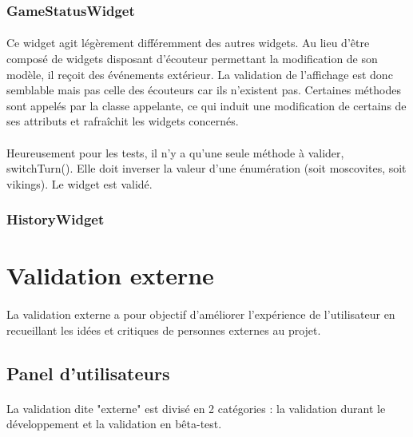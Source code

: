 \documentclass[11pt]{article} %
\begin{document}
\subsubsection{GameStatusWidget}
\paragraph{}
Ce widget agit légèrement différemment des autres widgets. Au lieu d'être composé de widgets disposant d’écouteur permettant la modification de son modèle, il reçoit des événements extérieur. La validation de l'affichage est donc semblable mais pas celle des écouteurs car ils n'existent pas. Certaines méthodes sont appelés par la classe appelante, ce qui induit une modification de certains de ses attributs et rafraîchit les widgets concernés.
\paragraph{}
Heureusement pour les tests, il n'y a qu'une seule méthode à valider, switchTurn(). Elle doit inverser la valeur d'une énumération (soit moscovites, soit vikings). Le widget est validé.

\subsubsection{HistoryWidget}

\paragraph{}

\section{Validation externe}
\paragraph{}
La validation externe a pour objectif d'améliorer l’expérience de l'utilisateur en recueillant les idées et critiques de personnes externes au projet.

\subsection{Panel d'utilisateurs}
\paragraph{}
La validation dite "externe" est divisé en 2 catégories : la validation durant le développement et la validation en bêta-test. 
\end{document}
